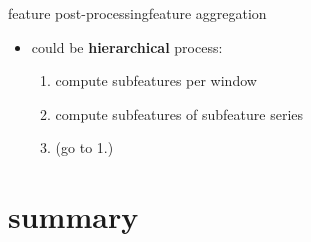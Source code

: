 \begin{frame}{feature post-processing}{feature aggregation}
\begin{itemize}
                \bigskip
                \item<2->   could be \textbf{hierarchical} process:
                    \begin{enumerate}
                        \item   compute subfeatures per window
                        \item   compute subfeatures of subfeature series
                        \item   (go to 1.)
                    \end{enumerate}
            \end{itemize}
		\end{frame}


        
    \section{summary}
